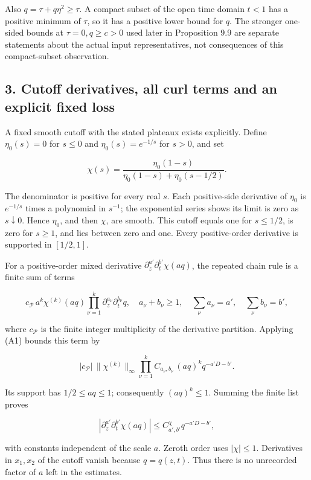 \documentclass[10pt,a4paper]{article}
\begin{document}
Also \(q=\tau+q\eta^2\ge\tau\). A compact subset of the open time domain \(t<1\) has a positive minimum of \(\tau\), so it has a positive lower bound for \(q\). The stronger one-sided bounds at \(\tau=0,q\ge c>0\) used later in Proposition 9.9 are separate statements about the actual input representatives, not consequences of this compact-subset observation.

\subsection{3. Cutoff derivatives, all curl terms and an explicit fixed loss}\label{cutoff-derivatives-all-curl-terms-and-an-explicit-fixed-loss}

A fixed smooth cutoff with the stated plateaux exists explicitly. Define \(\eta_0(s)=0\) for \(s\le0\) and \(\eta_0(s)=e^{-1/s}\) for \(s>0\), and set

\[
\chi(s)=\frac{\eta_0(1-s)}{\eta_0(1-s)+\eta_0(s-1/2)}.
\tag{A10}
\]

The denominator is positive for every real \(s\). Each positive-side derivative of \(\eta_0\) is \(e^{-1/s}\) times a polynomial in \(s^{-1}\); the exponential series shows its limit is zero as \(s\downarrow0\). Hence \(\eta_0\), and then \(\chi\), are smooth. This cutoff equals one for \(s\le1/2\), is zero for \(s\ge1\), and lies between zero and one. Every positive-order derivative is supported in \([1/2,1]\).

For a positive-order mixed derivative \(\partial_z^{a'}\partial_t^{b'}\chi(aq)\), the repeated chain rule is a finite sum of terms

\[
c_{\mathcal P}\,a^k\chi^{(k)}(aq)
\prod_{\nu=1}^k\partial_z^{a_\nu}\partial_t^{b_\nu}q,
\quad a_\nu+b_\nu\ge1,
\quad\sum_\nu a_\nu=a',\quad\sum_\nu b_\nu=b',
\tag{A11}
\]

where \(c_{\mathcal P}\) is the finite integer multiplicity of the derivative partition. Applying (A1) bounds this term by

\[
|c_{\mathcal P}|\,\|\chi^{(k)}\|_\infty
\prod_{\nu=1}^k C_{a_\nu,b_\nu}\,
(aq)^kq^{-a'D-b'}.
\tag{A12}
\]

Its support has \(1/2\le aq\le1\); consequently \((aq)^k\le1\). Summing the finite list proves

\[
|\partial_z^{a'}\partial_t^{b'}\chi(aq)|
\le C^\chi_{a',b'}q^{-a'D-b'},
\tag{A13}
\]

with constants independent of the scale \(a\). Zeroth order uses \(|\chi|\le1\). Derivatives in \(x_1,x_2\) of the cutoff vanish because \(q=q(z,t)\). Thus there is no unrecorded factor of \(a\) left in the estimates.
\end{document}

